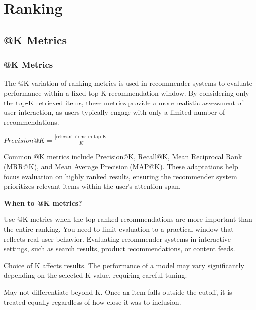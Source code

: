 \chapter{Ranking}

\clearpage
\thispagestyle{rankingstyle}
\section{@K Metrics}
\subsection{@K Metrics}

The @K variation of ranking metrics is used in recommender systems to evaluate performance within a fixed top-K recommendation
window. By considering only the top-K retrieved items, these metrics provide a more realistic assessment of user interaction,
as users typically engage with only a limited number of recommendations.

\begin{center}
    $\displaystyle Precision@K = \frac{|\text{relevant items in top-K}|}{K}$
\end{center}

Common @K metrics include Precision@K, Recall@K, Mean Reciprocal Rank (MRR@K), and Mean Average Precision (MAP@K).
These adaptations help focus evaluation on highly ranked results, ensuring the recommender system prioritizes relevant
items within the user's attention span.

\textbf{When to @K metrics?}

Use @K metrics when the top-ranked recommendations are more important than the entire ranking. You need to limit evaluation
to a practical window that reflects real user behavior. Evaluating recommender systems in interactive settings,
such as search results, product recommendations, or content feeds.

{
    \item Choice of K affects results. The performance of a model may vary significantly depending on the selected K value,
    requiring careful tuning.
    \item May not differentiate beyond K. Once an item falls outside the cutoff, it is treated equally regardless of
    how close it was to inclusion.
}

